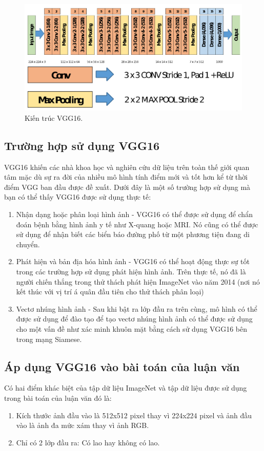 \begin{figure}[H]
	\centering
	\includegraphics[width=1\linewidth]{images/vgg16_imagenet_detail}
	\caption{Kiến trúc VGG16.}
	\label{fig:vgg16_imagenet_detail}
\end{figure}

\subsection{Trường hợp sử dụng VGG16}
VGG16 khiến các nhà khoa học và nghiên cứu dữ liệu trên toàn thế giới quan tâm mặc dù sự ra đời của nhiều mô hình tính điểm mới và tốt hơn kể từ thời điểm VGG ban đầu được đề xuất. Dưới đây là một số trường hợp sử dụng mà bạn có thể thấy VGG16 được sử dụng thực tế:
\begin{enumerate}
	\item Nhận dạng hoặc phân loại hình ảnh - VGG16 có thể được sử dụng để chẩn đoán bệnh bằng hình ảnh y tế như X-quang hoặc MRI. Nó cũng có thể được sử dụng để nhận biết các biển báo đường phố từ một phương tiện đang di chuyển.
	\item Phát hiện và bản địa hóa hình ảnh - VGG16 có thể hoạt động thực sự tốt trong các trường hợp sử dụng phát hiện hình ảnh. Trên thực tế, nó đã là người chiến thắng trong thử thách phát hiện ImageNet vào năm 2014 (nơi nó kết thúc với vị trí á quân đầu tiên cho thử thách phân loại)
	\item Vectơ nhúng hình ảnh - Sau khi bật ra lớp đầu ra trên cùng, mô hình có thể được sử dụng để đào tạo để tạo vectơ nhúng hình ảnh có thể được sử dụng cho một vấn đề như xác minh khuôn mặt bằng cách sử dụng VGG16 bên trong mạng Siamese.
\end{enumerate}

\subsection{Áp dụng VGG16 vào bài toán của luận văn}
Có hai điểm khác biệt của tập dữ liệu ImageNet và tập dữ liệu \cite{dataset} được sử dụng trong bài toán của luận văn đó là:
\begin{enumerate}
	\item Kích thước ảnh đầu vào là 512x512 pixel thay vì 224x224 pixel và ảnh đầu vào là ảnh đa mức xám thay vì ảnh RGB.
	\item Chỉ có 2 lớp đầu ra: Có lao hay không có lao.
\end{enumerate}

